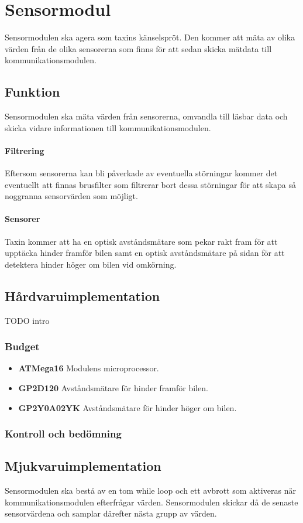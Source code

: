 \documentclass[designspec/spec.tex]{subfiles}
\begin{document}
\section{Sensormodul}
Sensormodulen ska agera som taxins känselspröt. Den kommer att mäta av olika
värden från de olika sensorerna som finns för att sedan skicka mätdata till
kommunikationsmodulen.

\subsection{Funktion}
Sensormodulen ska mäta värden från sensorerna, omvandla till läsbar data och
skicka vidare informationen till kommunikationsmodulen.

\paragraph{Filtrering}
Eftersom sensorerna kan bli påverkade av eventuella störningar kommer det
eventuellt att finnas brusfilter som filtrerar bort dessa störningar för att
skapa så noggranna sensorvärden som möjligt.

\paragraph{Sensorer}
Taxin kommer att ha en optisk avståndsmätare som pekar rakt fram för att
upptäcka hinder framför bilen samt en optisk avståndsmätare på sidan för att
detektera hinder höger om bilen vid omkörning.

\subsection{Hårdvaruimplementation} 
TODO intro

\subsubsection{Budget}

\begin{itemize}
	\item \textbf{ATMega16} Modulens microprocessor. 
    \item \textbf{GP2D120} Avståndsmätare för hinder framför bilen.
    \item \textbf{GP2Y0A02YK} Avståndsmätare för hinder höger om bilen.
\end{itemize}

\subsubsection{Kontroll och bedömning}

\subsection{Mjukvaruimplementation} 
Sensormodulen ska bestå av en tom while loop och ett avbrott som aktiveras när
kommunikationsmodulen efterfrågar värden. Sensormodulen skickar då de senaste
sensorvärdena och samplar därefter nästa grupp av värden.
\end{document}
